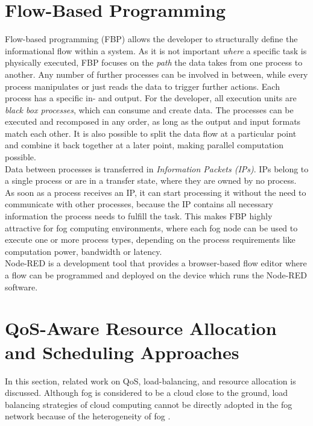 \section{Flow-Based Programming}
Flow-based programming (FBP) allows the developer to structurally define the informational flow within a system.
As it is not important \textit{where} a specific task is physically executed, FBP focuses on the \textit{path} the data takes from one process to another.
Any number of further processes can be involved in between, while every process manipulates or just reads the data to trigger further actions.
Each process has a specific in- and output.
For the developer, all execution units are \textit{black box processes}, which can consume and create data.
The processes can be executed and recomposed in any order, as long as the output and input formats match each other.
It is also possible to split the data flow at a particular point and combine it back together at a later point, making parallel computation possible.\\

Data between processes is transferred in \textit{Information Packets (IPs)}.
IPs belong to a single process or are in a transfer state, where they are owned by no process.
As soon as a process receives an IP, it can start processing it without the need to communicate with other processes, because the IP contains all necessary information the process needs to fulfill the task.
This makes FBP highly attractive for fog computing environments, where each fog node can be used to execute one or more process types, depending on the process requirements like computation power, bandwidth or latency.\\

Node-RED is a development tool that provides a browser-based flow editor where a flow can be programmed and deployed on the device which runs the Node-RED software.




\section{QoS-Aware Resource Allocation and Scheduling Approaches}
In this section, related work on QoS, load-balancing, and resource allocation is discussed.
Although fog is considered to be a cloud close to the ground, load balancing strategies of cloud computing cannot be directly adopted in the fog network because of the heterogeneity of fog \cite{novel-load-balancing}.


